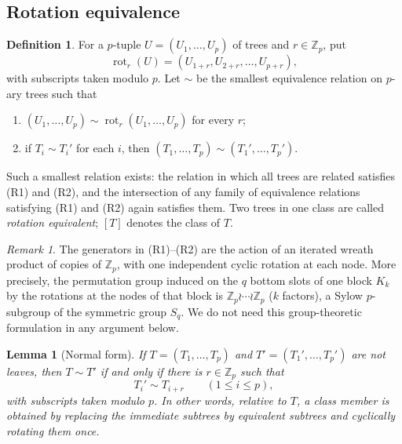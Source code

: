 \documentclass[11pt]{amsart}
\newtheorem{lemma}[theorem]{Lemma}
\theoremstyle{definition}
\newtheorem{definition}[theorem]{Definition}
\theoremstyle{remark}
\newtheorem{remark}[theorem]{Remark}
\newcommand{\Z}{\mathbb Z}
\newcommand{\rot}{\operatorname{rot}}
\begin{document}
\subsection{Rotation equivalence}
\begin{definition}
For a $p$-tuple $U=(U_1,\ldots,U_p)$ of trees and $r\in\Z_p$, put
\[
 \rot_r(U)=(U_{1+r},U_{2+r},\ldots,U_{p+r}),
\]
with subscripts taken modulo $p$.  Let $\sim$ be the smallest equivalence relation on $p$-ary trees such that
\begin{enumerate}
\item[\textup{(R1)}] $(U_1,\ldots,U_p)\sim\rot_r(U_1,\ldots,U_p)$ for every $r$;
\item[\textup{(R2)}] if $T_i\sim T_i'$ for each $i$, then $(T_1,\ldots,T_p)\sim(T_1',\ldots,T_p')$.
\end{enumerate}
Such a smallest relation exists: the relation in which all trees are related satisfies (R1) and (R2), and the intersection of any family of equivalence relations satisfying (R1) and (R2) again satisfies them.  Two trees in one class are called \emph{rotation equivalent}; $[T]$ denotes the class of $T$.
\end{definition}
\begin{remark}
The generators in (R1)--(R2) are the action of an iterated wreath product of copies of $\Z_p$, with one independent cyclic rotation at each node.  More precisely, the permutation group induced on the $q$ bottom slots of one block $K_k$ by the rotations at the nodes of that block is $\Z_p\wr\cdots\wr\Z_p$ ($k$ factors), a Sylow $p$-subgroup of the symmetric group $S_q$.  We do not need this group-theoretic formulation in any argument below.
\end{remark}
\begin{lemma}[Normal form]\label{lem:normal-form}
If $T=(T_1,\ldots,T_p)$ and $T'=(T_1',\ldots,T_p')$ are not leaves, then $T\sim T'$ if and only if there is $r\in\Z_p$ such that
\[
 T_i'\sim T_{i+r}\qquad(1\le i\le p),
\]
with subscripts taken modulo $p$.  In other words, relative to $T$, a class member is obtained by replacing the immediate subtrees by equivalent subtrees and cyclically rotating them once.
\end{lemma}
\end{document}
